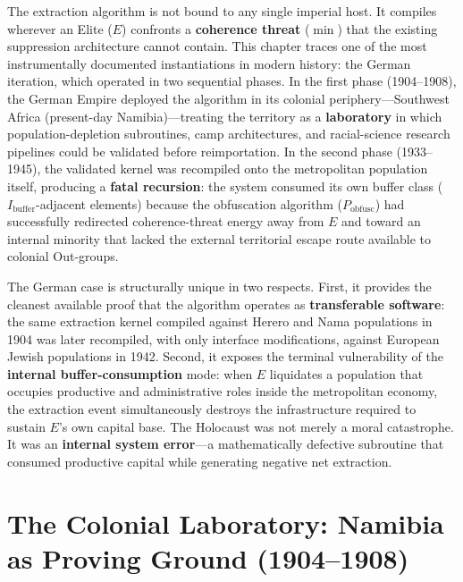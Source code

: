 \medskip

The extraction algorithm is not bound to any single imperial host. It compiles wherever an Elite ($E$) confronts a \textbf{coherence threat} ($\min$) that the existing suppression architecture cannot contain. This chapter traces one of the most instrumentally documented instantiations in modern history: the German iteration, which operated in two sequential phases. In the first phase (1904--1908), the German Empire deployed the algorithm in its colonial periphery---Southwest Africa (present-day Namibia)---treating the territory as a \textbf{laboratory} in which population-depletion subroutines, camp architectures, and racial-science research pipelines could be validated before reimportation. In the second phase (1933--1945), the validated kernel was recompiled onto the metropolitan population itself, producing a \textbf{fatal recursion}: the system consumed its own buffer class ($I_{\text{buffer}}$-adjacent elements) because the obfuscation algorithm ($P_{\text{obfusc}}$) had successfully redirected coherence-threat energy away from $E$ and toward an internal minority that lacked the external territorial escape route available to colonial Out-groups.

The German case is structurally unique in two respects. First, it provides the cleanest available proof that the algorithm operates as \textbf{transferable software}: the same extraction kernel compiled against Herero and Nama populations in 1904 was later recompiled, with only interface modifications, against European Jewish populations in 1942. Second, it exposes the terminal vulnerability of the \textbf{internal buffer-consumption} mode: when $E$ liquidates a population that occupies productive and administrative roles inside the metropolitan economy, the extraction event simultaneously destroys the infrastructure required to sustain $E$'s own capital base. The Holocaust was not merely a moral catastrophe. It was an \textbf{internal system error}---a mathematically defective subroutine that consumed productive capital while generating negative net extraction.

\section{The Colonial Laboratory: Namibia as Proving Ground (1904--1908)}
\label{sec:namibia_lab}


